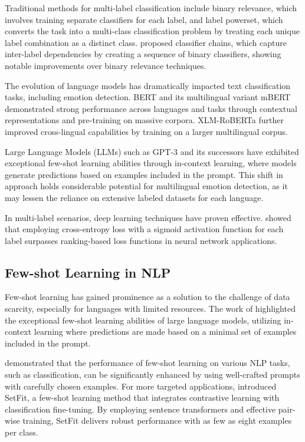 \documentclass[a4paper,12pt]{extarticle}
\begin{document}
Traditional methods for multi-label classification include binary relevance, which involves training separate classifiers for each label, and label powerset, which converts the task into a multi-class classification problem by treating each unique label combination as a distinct class. \cite{read2011classifier} proposed classifier chains, which capture inter-label dependencies by creating a sequence of binary classifiers, showing notable improvements over binary relevance techniques.

The evolution of language models has dramatically impacted text classification tasks, including emotion detection. BERT \cite{devlin2019bert} and its multilingual variant mBERT demonstrated strong performance across languages and tasks through contextual representations and pre-training on massive corpora. XLM-RoBERTa \cite{conneau2020unsupervised} further improved cross-lingual capabilities by training on a larger multilingual corpus.

Large Language Models (LLMs) such as GPT-3 \cite{brown2020language} and its successors have exhibited exceptional few-shot learning abilities through in-context learning, where models generate predictions based on examples included in the prompt. This shift in approach holds considerable potential for multilingual emotion detection, as it may lessen the reliance on extensive labeled datasets for each language.

In multi-label scenarios, deep learning techniques have proven effective. \cite{nam2014large} showed that employing cross-entropy loss with a sigmoid activation function for each label surpasses ranking-based loss functions in neural network applications.

\subsection{Few-shot Learning in NLP}

Few-shot learning has gained prominence as a solution to the challenge of data scarcity, especially for languages with limited resources. 
The work of \cite{brown2020language} highlighted the exceptional few-shot learning abilities of large language models, utilizing in-context learning where predictions are made based on a minimal set of examples included in the prompt.

\cite{gao2021making} demonstrated that the performance of few-shot learning on various NLP tasks, such as classification, can be significantly enhanced by using well-crafted prompts with carefully chosen examples. For more targeted applications, \cite{tunstall2022efficient} introduced SetFit, a few-shot learning method that integrates contrastive learning with classification fine-tuning. By employing sentence transformers and effective pair-wise training, SetFit delivers robust performance with as few as eight examples per class.
\end{document}
